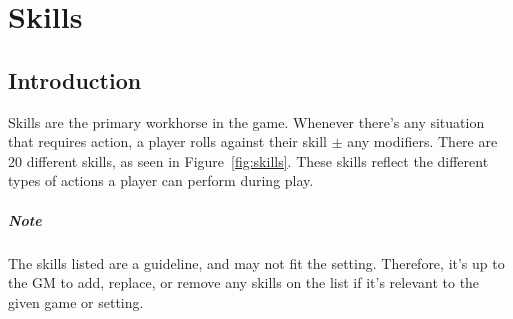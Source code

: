 \chapter{Skills} \label{chap:skills}
\section{Introduction}
Skills are the primary workhorse in the game. 
Whenever there's any situation that requires action, a player rolls against their skill $\pm$ any modifiers. 
There are 20 different skills, as seen in Figure~\ref{fig:skills}. 
These skills reflect the different types of actions a player can perform during play.

\paragraph{Note} The skills listed are a guideline, and may not fit the setting. 
Therefore, it's up to the GM to add, replace, or remove any skills on the list if it's relevant to the given game or setting.





